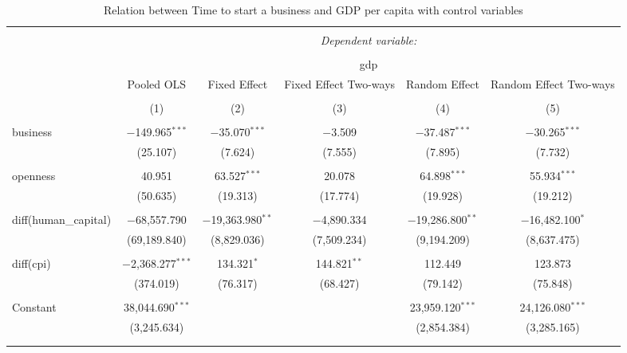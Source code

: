 \documentclass{article}
\begin{document}
\begin{table}[p!] \centering 
  \caption{Relation between Time to start a business and GDP per capita with control variables} 
  \label{} 
\begin{tabular}{@{\extracolsep{5pt}}lccccc} 
\\[-1.8ex]\hline 
\hline \\[-1.8ex] 
 & \multicolumn{5}{c}{\textit{Dependent variable:}} \\ 
\cline{2-6} 
\\[-1.8ex] & \multicolumn{5}{c}{gdp} \\ 
 & Pooled OLS & Fixed Effect & Fixed Effect Two-ways & Random Effect & Random Effect Two-ways \\ 
\\[-1.8ex] & (1) & (2) & (3) & (4) & (5)\\ 
\hline \\[-1.8ex] 
 business & $-$149.965$^{***}$ & $-$35.070$^{***}$ & $-$3.509 & $-$37.487$^{***}$ & $-$30.265$^{***}$ \\ 
  & (25.107) & (7.624) & (7.555) & (7.895) & (7.732) \\ 
  & & & & & \\ 
 openness & 40.951 & 63.527$^{***}$ & 20.078 & 64.898$^{***}$ & 55.934$^{***}$ \\ 
  & (50.635) & (19.313) & (17.774) & (19.928) & (19.212) \\ 
  & & & & & \\ 
 diff(human\_capital) & $-$68,557.790 & $-$19,363.980$^{**}$ & $-$4,890.334 & $-$19,286.800$^{**}$ & $-$16,482.100$^{*}$ \\ 
  & (69,189.840) & (8,829.036) & (7,509.234) & (9,194.209) & (8,637.475) \\ 
  & & & & & \\ 
 diff(cpi) & $-$2,368.277$^{***}$ & 134.321$^{*}$ & 144.821$^{**}$ & 112.449 & 123.873 \\ 
  & (374.019) & (76.317) & (68.427) & (79.142) & (75.848) \\ 
  & & & & & \\ 
 Constant & 38,044.690$^{***}$ &  &  & 23,959.120$^{***}$ & 24,126.080$^{***}$ \\ 
  & (3,245.634) &  &  & (2,854.384) & (3,285.165) \\ 
  & & & & & \\ 
\hline \\[-1.8ex] 

\end{tabular}
\end{table}
\end{document}
